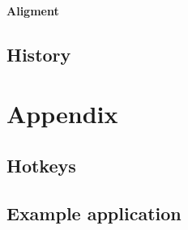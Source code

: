 \documentclass[titlepage,oneside,11pt]{book}
\begin{document}
\subsubsection{Aligment}
\section{History}
\chapter{Appendix}
\section{Hotkeys}
\section{Example application}
\end{document}
